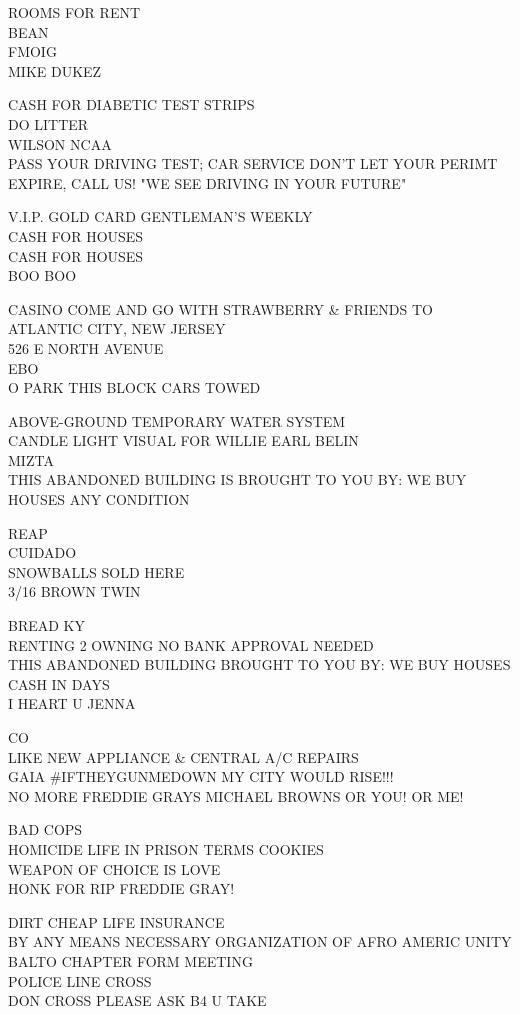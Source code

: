 \documentclass[10pt,letterpaper]{article}
\begin{document}
ROOMS FOR RENT\\
BEAN\\
FMOIG\\
MIKE DUKEZ

CASH FOR DIABETIC TEST STRIPS\\
DO LITTER\\
WILSON NCAA\\
PASS YOUR DRIVING TEST; CAR SERVICE DON'T LET YOUR PERIMT EXPIRE, CALL US!  "WE SEE DRIVING IN YOUR FUTURE"

V.I.P. GOLD CARD GENTLEMAN'S WEEKLY\\
CASH FOR HOUSES\\
CASH FOR HOUSES\\
BOO BOO

CASINO COME AND GO WITH STRAWBERRY \& FRIENDS TO ATLANTIC CITY, NEW JERSEY\\
526 E NORTH AVENUE\\
EBO\\
O PARK THIS BLOCK CARS TOWED

ABOVE{-}GROUND TEMPORARY WATER SYSTEM\\
CANDLE LIGHT VISUAL FOR WILLIE EARL BELIN\\
MIZTA\\
THIS ABANDONED BUILDING IS BROUGHT TO YOU BY: WE BUY HOUSES ANY CONDITION

REAP\\
CUIDADO\\
SNOWBALLS SOLD HERE\\
3/16 BROWN TWIN

BREAD KY\\
RENTING 2 OWNING NO BANK APPROVAL NEEDED\\
THIS ABANDONED BUILDING BROUGHT TO YOU BY: WE BUY HOUSES CASH IN DAYS\\
I HEART U JENNA

CO\\
LIKE NEW APPLIANCE \& CENTRAL A/C REPAIRS\\
GAIA \#IFTHEYGUNMEDOWN MY CITY WOULD RISE!!!\\
NO MORE FREDDIE GRAYS MICHAEL BROWNS OR YOU!  OR ME!

BAD COPS\\
HOMICIDE LIFE IN PRISON TERMS COOKIES\\
WEAPON OF CHOICE IS LOVE\\
HONK FOR RIP FREDDIE GRAY!

DIRT CHEAP LIFE INSURANCE\\
BY ANY MEANS NECESSARY ORGANIZATION OF AFRO AMERIC UNITY BALTO CHAPTER FORM MEETING\\
POLICE LINE CROSS\\
DON CROSS PLEASE ASK B4 U TAKE
\end{document}
